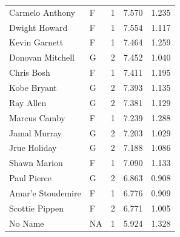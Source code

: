 \begin{table}[t]
\begin{tabular*}{\linewidth}{@{\extracolsep{\fill}}llcrr}
Carmelo Anthony & F & 1 & 7.570 & 1.235 \\ 
Dwight Howard & F & 1 & 7.554 & 1.117 \\ 
Kevin Garnett & F & 1 & 7.464 & 1.259 \\ 
Donovan Mitchell & G & 2 & 7.452 & 1.040 \\ 
Chris Bosh & F & 1 & 7.411 & 1.195 \\ 
Kobe Bryant & G & 2 & 7.393 & 1.135 \\ 
Ray Allen & G & 2 & 7.381 & 1.129 \\ 
Marcus Camby & F & 1 & 7.239 & 1.288 \\ 
Jamal Murray & G & 2 & 7.203 & 1.029 \\ 
Jrue Holiday & G & 2 & 7.188 & 1.086 \\ 
Shawn Marion & F & 1 & 7.090 & 1.133 \\ 
Paul Pierce & G & 2 & 6.863 & 0.908 \\ 
Amar'e Stoudemire & F & 1 & 6.776 & 0.909 \\ 
Scottie Pippen & F & 2 & 6.771 & 1.005 \\ 
No Name & NA & 1 & 5.924 & 1.328 \\ 
\bottomrule
\end{tabular*}
\end{table}

